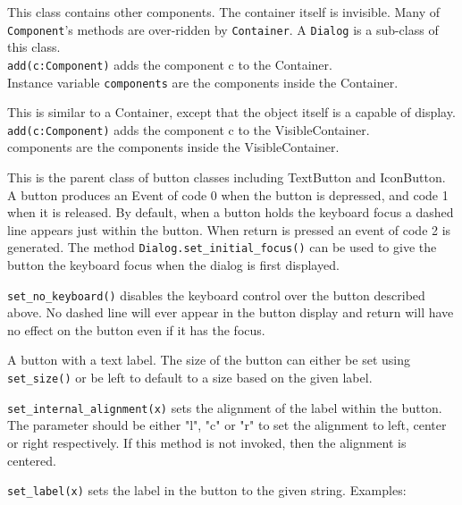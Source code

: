 
This class contains other components. The container itself is
invisible. Many of \texttt{Component}'s methods are over-ridden
by \texttt{Container}. A \texttt{Dialog} is a sub-class of this
class.\\
\texttt{add(c:Component)} adds the component c to the Container.\\
Instance variable \texttt{components} are the components inside the Container.


This is similar to a Container, except that the object itself is a
capable of display.\\
\texttt{add(c:Component)} adds the component c to the VisibleContainer.\\
components are the components inside the VisibleContainer.


This is the parent class of button classes including TextButton and
IconButton. A button produces an Event of code 0 when the button is
depressed, and code 1 when it is released. By default, when a button
holds the keyboard focus a dashed line appears just
within the button. When return is pressed an event of code 2 is
generated. The method \texttt{Dialog.set\_initial\_focus()} can be used to give
the button the keyboard focus when the dialog is first displayed.

\texttt{set\_no\_keyboard()} disables the keyboard control over the button
described above. No dashed line will ever appear in the button
display and return will have no effect on the button even if it has the
focus.


A button with a text label. The size of the button can either be set
using \texttt{set\_size()} or be left to default to a size based on the given
label.

\texttt{set\_internal\_alignment(x)} sets the alignment of the label within the
button. The parameter should be either "l", "c" or "r" to
set the alignment to left, center or right respectively. If this method
is not invoked, then the alignment is centered.

\texttt{set\_label(x)} sets the label in the button to the given string.
Examples:

